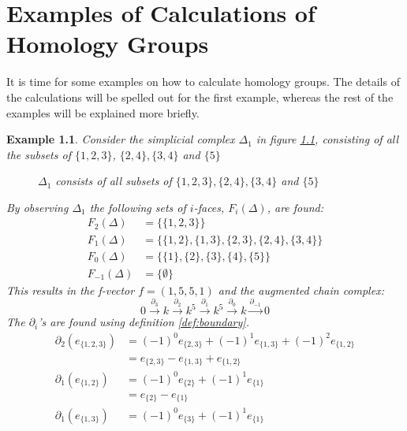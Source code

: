 \documentclass[11pt,a4paper,twoside, openright]{report}
\newtheorem{myex}[mythm]{Example}
\begin{document}
\chapter{Examples of Calculations of Homology Groups}
It is time for some examples on how to calculate homology groups. The details of the calculations will be spelled out for the first example, whereas the rest of the examples will be explained more briefly.
\begin{myex}
Consider the simplicial complex $\Delta_1$ in figure \ref{fig:ex1}, consisting of all the subsets of $\{1,2,3\}$, $\{2,4\},\{3,4\}$ and $\{5\}$
\begin{figure}[H]
\center
{}
\caption{$\Delta_1$ consists of all subsets of $\{1,2,3\},\{2,4\},\{3,4\}$ and $\{5\}$}
\label{fig:ex1}
\end{figure}
By observing $\Delta_1$ the following sets of $i$-faces, $F_i(\Delta)$, are found:
\begin{align*}
F_2(\Delta) &= \{\{1,2,3\}\}\\
F_1(\Delta) &= \{\{1,2\},\{1,3\},\{2,3\},\{2,4\},\{3,4\}\}\\
F_0(\Delta) &= \{\{1\},\{2\},\{3\},\{4\},\{5\}\}\\
F_{-1}(\Delta) &= \{\emptyset\}
\end{align*}
This results in the f-vector $f=(1,5,5,1)$ and the augmented chain complex:
\begin{equation*}
0\overset{\partial_3}{\longrightarrow} k\overset{\partial_2}{\longrightarrow} k^5\overset{\partial_1}{\longrightarrow} k^5\overset{\partial_0}{\longrightarrow} k \overset{\partial_{-1}}{\to} 0
\end{equation*}
The $\partial_i$'s are found using definition \ref{def:boundary}. 
\begin{align*}
\partial_2(e_{\{1,2,3\}})&=(-1)^0e_{\{2,3\}}+(-1)^1e_{\{1,3\}}+(-1)^2e_{\{1,2\}}\\
&=e_{\{2,3\}}-e_{\{1,3\}}+e_{\{1,2\}}\\
\partial_1(e_{\{1,2\}})&=(-1)^0e_{\{2\}}+(-1)^1e_{\{1\}}\\
&=e_{\{2\}}-e_{\{1\}}\\
\partial_1(e_{\{1,3\}})&=(-1)^0e_{\{3\}}+(-1)^1e_{\{1\}}\\

\end{align*}
\end{myex}
\end{document}
